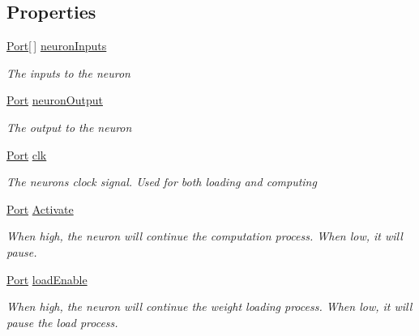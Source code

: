 \subsection*{Properties}
\begin{DoxyCompactItemize}
\item 
\hyperlink{class_n_n_gen_1_1_port}{Port}\mbox{[}$\,$\mbox{]} \hyperlink{class_n_n_gen_1_1_sync_neuron_a717f010aa22ec2a35ec0f314549a3177}{neuron\+Inputs}
\begin{DoxyCompactList}\small\item\em The inputs to the neuron \end{DoxyCompactList}\item 
\hyperlink{class_n_n_gen_1_1_port}{Port} \hyperlink{class_n_n_gen_1_1_sync_neuron_a0124d151cc6e1ff3dfbfe917e4d0ab2f}{neuron\+Output}
\begin{DoxyCompactList}\small\item\em The output to the neuron \end{DoxyCompactList}\item 
\hyperlink{class_n_n_gen_1_1_port}{Port} \hyperlink{class_n_n_gen_1_1_sync_neuron_ac05c041707c4ede2fd412b9ea7a9bb08}{clk}
\begin{DoxyCompactList}\small\item\em The neuron\textquotesingle{}s clock signal. Used for both loading and computing \end{DoxyCompactList}\item 
\hyperlink{class_n_n_gen_1_1_port}{Port} \hyperlink{class_n_n_gen_1_1_sync_neuron_a6aec644cafdc8c9f4d03515e3c0e7b0b}{Activate}
\begin{DoxyCompactList}\small\item\em When high, the neuron will continue the computation process. When low, it will pause. \end{DoxyCompactList}\item 
\hyperlink{class_n_n_gen_1_1_port}{Port} \hyperlink{class_n_n_gen_1_1_sync_neuron_a5cb034f95e9d284d3638f9e817c3f26f}{load\+Enable}
\begin{DoxyCompactList}\small\item\em When high, the neuron will continue the weight loading process. When low, it will pause the load process. \end{DoxyCompactList}\item 

\end{DoxyCompactItemize}
